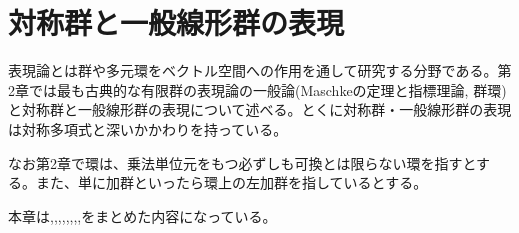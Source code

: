 \documentclass{ltjsreport}
\begin{document}
\chapter{対称群と一般線形群の表現}

表現論とは群や多元環をベクトル空間への作用を通して研究する分野である。第2章では最も古典的な有限群の表現論の一般論(Maschkeの定理と指標理論, 群環)と対称群と一般線形群の表現について述べる。とくに対称群・一般線形群の表現は対称多項式と深いかかわりを持っている。

なお第2章で環は、乗法単位元をもつ必ずしも可換とは限らない環を指すとする。また、単に加群といったら環上の左加群を指しているとする。

本章は\cite{tensor_alg_and_rep},\cite{alg_2},\cite{homological},\cite{young_tableau},\cite{serre},\cite{fulton_harris},\cite{adv_alg},\cite{macdonald},\cite{sym_func}をまとめた内容になっている。



\newpage


\newpage


\newpage

\end{document}
